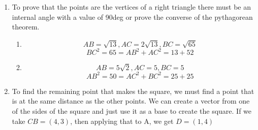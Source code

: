 \begin{enumerate}
    \item [37.] To prove that the points are the vertices of a right triangle there must be an internal angle with a value of 90deg or prove the converse of the pythagorean theorem.
    \begin{enumerate}
        \item
        \[AB = \sqrt{13}, AC=2\sqrt{13}, BC=\sqrt{65}\]
        \[BC^2 = 65 = AB^2 + AC^2 = 13 + 52\]
        \item
        \[AB = 5\sqrt{2}, AC=5, BC=5\]
        \[AB^2 = 50 = AC^2 + BC^2 = 25 + 25\]
    \end{enumerate}
    
    \item [38.] To find the remaining point that makes the square, we must find a point that is at the same distance as the other points. We can create a vector from one of the sides of the square and just use it as a base to create the square.
    If we take $CB=(4,3)$, then applying that to A, we get $D=(1, 4)$ 

\end{enumerate}